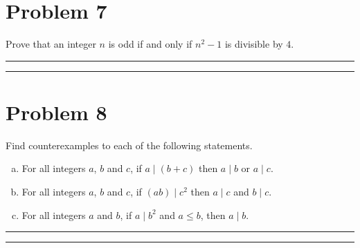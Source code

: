 \documentclass{article}
\theoremstyle{definition}
\newenvironment{solution}{\bigskip\hrule{\hfill}}{\bigskip\hrule{\hfill}} %
\begin{document}

\newpage


\section*{Problem 7}

Prove that an integer $n$ is odd if and only if $n^2-1$ is divisible by $4$.

\begin{solution}


\end{solution}


\newpage


\section*{Problem 8}

Find counterexamples to each of the following statements.

\begin{enumerate}[a)] %
    \item For all integers $a$, $b$ and $c$, if $a\mid\left(b+c\right)$ then $a\mid b$ or $a\mid c$.

    \item For all integers $a$, $b$ and $c$, if $\left(ab\right)\mid c^2$ then $a\mid c$ and $b\mid c$.

    \item For all integers $a$ and $b$, if $a\mid b^2$ and $a\leq b$, then $a\mid b$.
\end{enumerate}

\begin{solution}


\end{solution}
\end{document}
